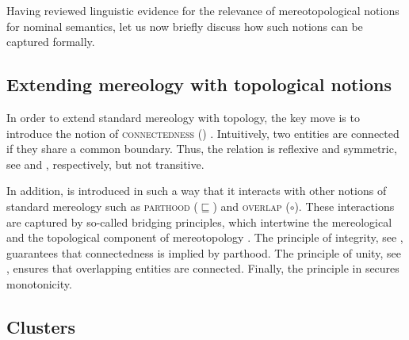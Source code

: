 \documentclass[output=paper]{langscibook}
\begin{document}
\ea {}\label{wan:ex:half}
\label{wan:ex:a-half}
\z
\z

\noindent Having reviewed linguistic evidence for the relevance of mereotopological notions for nominal semantics, let us now briefly discuss how such notions can be captured formally.

\subsection{Extending mereology with topological notions}\label{wan:sec:extending-mereology-with-topological-notions}

In order to extend standard mereology with topology, the key move is to introduce the notion of \textsc{connectedness} () \citep[53]{casati_varzi1999parts}. Intuitively, two entities are connected if they share a common boundary. Thus, the  relation is reflexive and symmetric, see  and , respectively, but not transitive.

\ea {} \label{wan:form:reflexivity}
 \label{wan:form:symmetry}
\z
\z

\noindent In addition,  is introduced in such a way that it interacts with other notions of standard mereology such as \textsc{parthood} ($\sqsubseteq$) and \textsc{overlap} ($\circ$). These interactions are captured by so-called bridging principles, which intertwine the mereological and the topological component of mereotopology \citep{varzi2007spatial}. The principle of integrity, see , guarantees that connectedness is implied by parthood. The principle of unity, see , ensures that overlapping entities are connected. Finally, the principle in  secures monotonicity. 

\ea {}\label{wan:form:integrity}
\label{wan:form:unity}
\label{wan:form:monotonicity}
\z
\z

\subsection{Clusters}\label{wan:sec:clusters}
\end{document}
